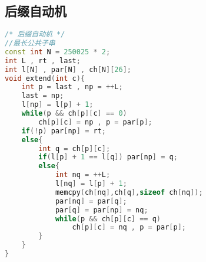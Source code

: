 \subsection{后缀自动机}
\begin{lstlisting}[language=C++]
/* 后缀自动机 */
//最长公共子串
const int N = 250025 * 2;
int L , rt , last;
int l[N] , par[N] , ch[N][26];
void extend(int c){
    int p = last , np = ++L;
    last = np;
    l[np] = l[p] + 1;
    while(p && ch[p][c] == 0)
        ch[p][c] = np , p = par[p];
    if(!p) par[np] = rt;
    else{
        int q = ch[p][c];
        if(l[p] + 1 == l[q]) par[np] = q;
        else{
            int nq = ++L;
            l[nq] = l[p] + 1;
            memcpy(ch[nq],ch[q],sizeof ch[nq]);
            par[nq] = par[q];
            par[q] = par[np] = nq;
            while(p && ch[p][c] == q)
                ch[p][c] = nq , p = par[p];
        }
    }
}


\end{lstlisting}
